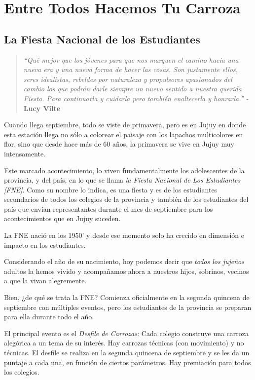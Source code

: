 \documentclass[]{article}
\date{}
\begin{document}
\section{Entre Todos Hacemos Tu
Carroza}\label{entre-todos-hacemos-tu-carroza}

\subsection{La Fiesta Nacional de los
Estudiantes}\label{la-fiesta-nacional-de-los-estudiantes}

\begin{quote}
\emph{``Qué mejor que los jóvenes para que nos marquen el camino hacia
una nueva era y una nueva forma de hacer las cosas. Son justamente
ellos, seres idealistas, rebeldes por naturaleza y propulsores
apasionados del cambio los que podrán darle siempre un nuevo sentido a
nuestra querida Fiesta. Para continuarla y cuidarla pero también
enaltecerla y honrarla.'' -} \textbf{Lucy Vilte}
\end{quote}

Cuando llega septiembre, todo se viste de primavera, pero es en Jujuy en
donde esta estación llega no sólo a colorear el paisaje con los lapachos
multicolores en flor, sino que desde hace más de 60 años, la primavera
se vive en Jujuy muy intensamente.

Este marcado acontecimiento, lo viven fundamentalmente los adolescentes
de la provincia, y del país, en lo que se llama \emph{la Fiesta Nacional
de Los Estudiantes {[}FNE{]}}. Como su nombre lo indica, es una fiesta y
es de los estudiantes secundarios de todos los colegios de la provincia
y también de los estudiantes del país que envían representantes durante
el mes de septiembre para los acontecimientos que en Jujuy suceden.

La FNE nació en los 1950' y desde ese momento solo ha crecido en
dimensión e impacto en los estudiantes.

Considerando el año de su nacimiento, hoy podemos decir que \emph{todos
los jujeños} adultos la hemos vivido y acompañamos ahora a nuestros
hijos, sobrinos, vecinos a que la vivan alegremente.

Bien, ¿de qué se trata la FNE? Comienza oficialmente en la segunda
quincena de septiembre con múltiples eventos, pero los estudiantes de la
provincia se preparan para ella durante todo el año.

El principal evento es el \emph{Desfile de Carrozas:} Cada colegio
construye una carroza alegórica a un tema de su interés. Hay carrozas
técnicas (con movimiento) y no técnicas. El desfile se realiza en la
segunda quincena de septiembre y se les da un puntaje a cada una, en
función de ciertos parámetros. Hay premiación para todos los colegios.
\end{document}
